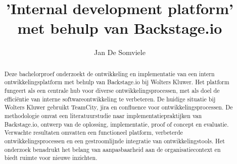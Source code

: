 \documentclass{hogent-article}
\title{'Internal development platform' met behulp van Backstage.io}
\author{Jan De Somviele}
\begin{document}
    
    \begin{abstract}
        Deze bachelorproef onderzoekt de ontwikkeling en implementatie van een intern ontwikkelingsplatform met behulp van Backstage.io bij Wolters Kluwer. Het platform fungeert als een centrale hub voor diverse ontwikkelingsprocessen, met als doel de efficiëntie van interne softwareontwikkeling te verbeteren. De huidige situatie bij Wolters Kluwer gebruikt TeamCity, jira en confluence voor ontwikkelingsprocessen. De methodologie omvat een literatuurstudie naar implementatiepraktijken van Backstage.io, ontwerp van de oplossing, implementatie, proof of concept en evaluatie. Verwachte resultaten omvatten een functioneel platform, verbeterde ontwikkelingsprocessen en een gestroomlijnde integratie van ontwikkelingstools. Het onderzoek benadrukt het belang van aanpasbaarheid aan de organisatiecontext en biedt ruimte voor nieuwe inzichten.
    \end{abstract}
    
    \tableofcontents
    
    
    
    \printbibliography[heading=bibintoc]
    
\end{document}
